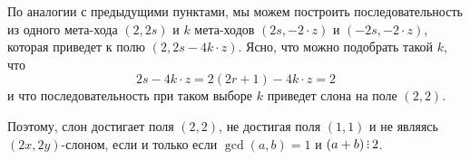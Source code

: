 \begin{enumerate}
По аналогии с предыдущими пунктами, мы можем построить последовательность из
одного мета-хода $(2,2s)$ и $k$ мета-ходов $(2s,-2 \cdot z)$ и $(-2s,-2 \cdot z)$,
которая приведет к полю $(2,2s-4k\cdot z)$. Ясно, что можно подобрать такой $k$,
что $$2s-4k\cdot z = 2(2r+1)-4k\cdot z = 2$$
и что последовательность при таком выборе $k$ приведет слона на поле $(2,2)$.

Поэтому, слон достигает поля $(2,2)$, не достигая поля $(1,1)$ и не являясь $(2x,2y)$-слоном,
если и только если $\gcd(a,b)=1$ и $(a+b) \divsby 2$.

\end{enumerate}
